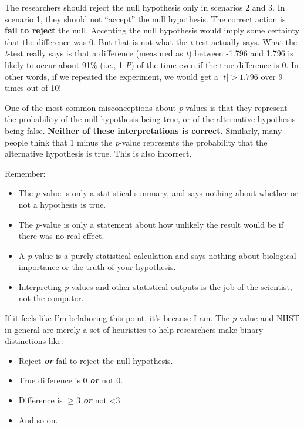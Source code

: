\documentclass[
  13,
  letterpaper,
]{report}
\providecommand{\tightlist}{%
  \setlength{\itemsep}{0pt}\setlength{\parskip}{0pt}}
\begin{document}
The researchers should reject the null hypothesis only in scenarios 2
and 3. In scenario 1, they should not ``accept'' the null hypothesis.
The correct action is \textbf{fail to reject} the null. Accepting the
null hypothesis would imply some certainty that the difference was 0.
But that is not what the \emph{t}-test actually says. What the
\emph{t}-test really says is that a difference (measured as \emph{t})
between -1.796 and 1.796 is likely to occur about 91\% (i.e.,
1-\emph{P}) of the time even if the true difference is 0. In other
words, if we repeated the experiment, we would get a \(|t|>1.796\) over
9 times out of 10!

One of the most common misconceptions about \emph{p}-values is that they
represent the probability of the null hypothesis being true, or of the
alternative hypothesis being false. \textbf{Neither of these
interpretations is correct.} Similarly, many people think that 1 minus
the \emph{p}-value represents the probability that the alternative
hypothesis is true. This is also incorrect.

Remember:

\begin{itemize}
\tightlist
\item
  The \emph{p}-value is only a statistical summary, and says nothing
  about whether or not a hypothesis is true.
\item
  The \emph{p}-value is only a statement about how unlikely the result
  would be if there was no real effect.
\item
  A \emph{p}-value is a purely statistical calculation and says nothing
  about biological importance or the truth of your hypothesis.
\item
  Interpreting \emph{p}-values and other statistical outputs is the job
  of the scientist, not the computer.
\end{itemize}

If it feels like I'm belaboring this point, it's because I am. The
\emph{p}-value and NHST in general are merely a set of heuristics to
help researchers make binary distinctions like:

\begin{itemize}
\tightlist
\item
  Reject \textbf{\emph{or}} fail to reject the null hypothesis.
\item
  True difference is 0 \textbf{\emph{or}} not 0.
\item
  Difference is \(\ge3\) \textbf{\emph{or}} not \textless3.
\item
  And so on.
\end{itemize}
\end{document}
